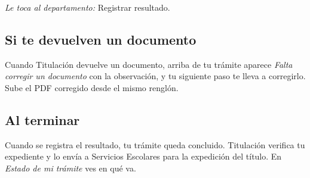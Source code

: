 \emph{Le toca al departamento:} Registrar resultado. 
\subsection{Si te devuelven un documento}
Cuando Titulación devuelve un documento, arriba de tu trámite aparece \emph{Falta corregir un documento} con la observación, y tu siguiente paso te lleva a corregirlo. Sube el PDF corregido desde el mismo renglón.
\subsection{Al terminar}
Cuando se registra el resultado, tu trámite queda concluido. Titulación verifica tu expediente y lo envía a Servicios Escolares para la expedición del título. En \emph{Estado de mi trámite} ves en qué va.
